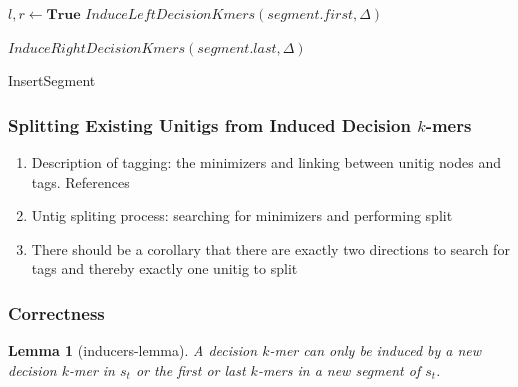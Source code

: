 \documentclass[preprint,number,12pt]{elsarticle}
\newtheorem{lemma}[theorem]{Lemma}
\begin{document}
\begin{algorithm}
	\DontPrintSemicolon
	 
	 $l, r \longleftarrow \bm{True}$\;
	  {
		$InduceLeftDecisionKmers(segment.first, \Delta)$
	} 

	  {
		$InduceRightDecisionKmers(segment.last, \Delta)$
	} 

\caption{InsertSegment}\label{InsertSegment}
\end{algorithm}

\subsubsection{Splitting Existing Unitigs from Induced Decision $k$-mers}\label{sec:splitting}

\begin{enumerate}
	\item Description of tagging: the minimizers and linking between unitig nodes and tags. References 
	\item Untig spliting process: searching for minimizers and performing split
	\item There should be a corollary that there are exactly two directions to search for tags and thereby exactly one unitig to split
\end{enumerate}

\subsubsection{Correctness}\label{sec:correctness}

\begin{lemma}[inducers-lemma]
	\label{inducers-lemma}
	A decision $k$-mer can only be induced by a new decision $k$-mer in $s_t$ or the first or last $k$-mers in a new segment of $s_t$.
\end{lemma}
\end{document}
